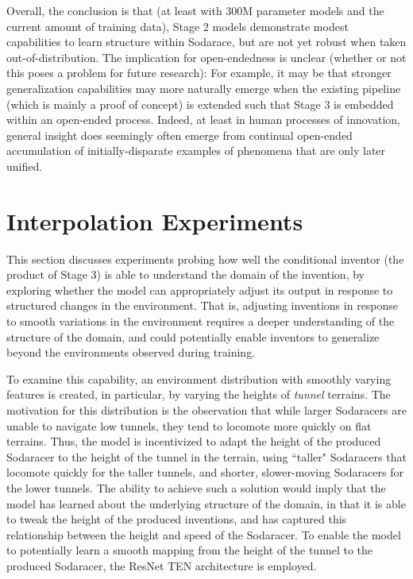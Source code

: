 \documentclass{article}
\begin{document}
Overall, the conclusion is that (at least with 300M parameter models and the current amount of training data), Stage 2 models demonstrate modest capabilities to learn structure within Sodarace, but are not yet robust when taken out-of-distribution. The implication for open-endedness is unclear (whether or not this poses a problem for future research): For example, it may be that stronger generalization capabilities may more naturally emerge when the existing pipeline (which is mainly a proof of concept) is extended such that Stage 3 is embedded within an open-ended process. 
Indeed, at least in human processes of innovation, general
insight does seemingly often emerge from continual open-ended 
accumulation of initially-disparate examples of phenomena that are only later unified.

\section{Interpolation Experiments}
\label{appendix:interpolation}


This section discusses experiments probing how well the conditional inventor (the product of Stage 3) is able to understand the domain of the invention, by exploring whether the model can appropriately adjust its output in response to structured changes in the environment. That is, adjusting inventions in response to smooth variations in the environment requires a deeper understanding of the structure of the domain, and could potentially enable inventors to generalize beyond the environments observed during training. 

To examine this capability, an environment distribution with smoothly varying features is created, in particular, by varying the heights of \emph{tunnel} terrains. 
The motivation for this distribution is the observation that while larger Sodaracers are unable to navigate low tunnels, they tend to locomote more quickly on flat terrains. Thus, the model is incentivized to adapt the height of the produced Sodaracer to the height of the tunnel in the terrain, using ``taller" Sodaracers that locomote quickly for the taller tunnels, and shorter, slower-moving Sodaracers for the lower tunnels. The ability to achieve such a solution would imply that the model has learned about the underlying structure of the domain, in that it is able to tweak the height of the produced inventions, and has captured this relationship between the height and speed of the Sodaracer. To enable the model to %
potentially learn a smooth mapping from the height of the tunnel to the produced Sodaracer, the ResNet TEN architecture is employed.  
\end{document}
